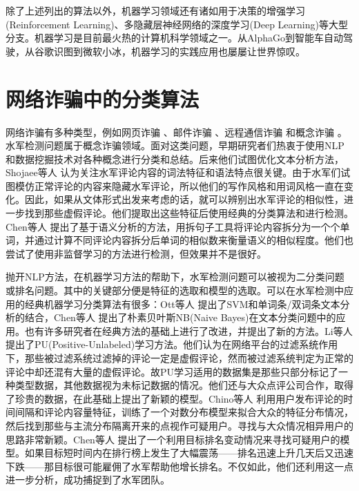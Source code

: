 除了上述列出的算法以外，机器学习领域还有诸如用于决策的增强学习(Reinforcement Learning)、多隐藏层神经网络的深度学习(Deep Learning)等大型分支。机器学习是目前最火热的计算机科学领域之一。从AlphaGo到智能车自动驾驶，从谷歌识图到微软小冰，机器学习的实践应用也屡屡让世界惊叹。



\section{网络诈骗中的分类算法}

网络诈骗有多种类型，例如网页诈骗 \cite{Spirin:2012}、邮件诈骗 \cite{Castillo:2007}、远程通信诈骗 \cite{Yao:2017}和概念诈骗 \cite{Jindal:2008}。水军检测问题属于概念诈骗领域。面对这类问题，早期研究者们热衷于使用NLP和数据挖掘技术对各种概念进行分类和总结。后来他们试图优化文本分析方法，Shojaee等人 \parencite{Shojaee:2013}认为关注水军评论内容的词法特征和语法特点很关键。由于水军们试图模仿正常评论的内容来隐藏水军评论，所以他们的写作风格和用词风格一直在变化。因此，如果从文体形式出发来考虑的话，就可以辨别出水军评论的相似性，进一步找到那些虚假评论。他们提取出这些特征后使用经典的分类算法和进行检测。Chen等人 \parencite{Chen:2013}提出了基于语义分析的方法，用拆句子工具将评论内容拆分为一个个单词，并通过计算不同评论内容拆分后单词的相似数来衡量语义的相似程度。他们也尝试了使用非监督学习的方法进行检测，但效果并不是很好。

抛开NLP方法，在机器学习方法的帮助下，水军检测问题可以被视为二分类问题或排名问题。其中的关键部分便是特征的选取和模型的选取。可以在水军检测中应用的经典机器学习分类算法有很多：Ott等人 \parencite{Ott:2011}提出了SVM和单词条/双词条文本分析的结合，Chen等人 \parencite{CHEN:2009}提出了朴素贝叶斯NB(Naive Bayes)在文本分类问题中的应用。也有许多研究者在经典方法的基础上进行了改进，并提出了新的方法。Li等人 \parencite{Li:2014}提出了PU(Positive-Unlabeled)学习方法。他们认为在网络平台的过滤系统作用下，那些被过滤系统过滤掉的评论一定是虚假评论，然而被过滤系统判定为正常的评论中却还混有大量的虚假评论。故PU学习适用的数据集是那些只部分标记了一种类型数据，其他数据视为未标记数据的情况。他们还与大众点评公司合作，取得了珍贵的数据，在此基础上提出了新颖的模型。Chino等人 \parencite{Chino:2017}利用用户发布评论的时间间隔和评论内容量特征，训练了一个对数分布模型来拟合大众的特征分布情况，然后找到那些与主流分布隔离开来的点视作可疑用户。寻找与大众情况相异用户的思路非常新颖。Chen等人 \parencite{Chen:2017}提出了一个利用目标排名变动情况来寻找可疑用户的模型。如果目标短时间内在排行榜上发生了大幅震荡——排名迅速上升几天后又迅速下跌——那目标很可能雇佣了水军帮助他增长排名。不仅如此，他们还利用这一点进一步分析，成功捕捉到了水军团队。




